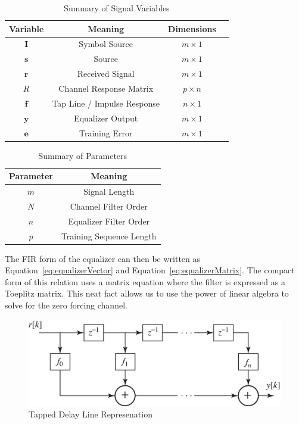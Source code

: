 \documentclass[]{article}
\begin{document}
\begin{table}[H]
\begin{center}
\begin{tabular}{|c|c|c|c|}
\hline Variable & Meaning & Dimensions \\
\hline \hline
$\mathbf{I}$ & Symbol Source & $ m \times 1$ \\ \hline
$\mathbf{s}$ & Source & $m\times 1 $\\ \hline
$\mathbf{r}$ & Received Signal & $m\times 1$ \\ \hline
$R$ & Channel Response Matrix & $p\times n$ \\ \hline
$\mathbf{f}$ & Tap Line / Impulse Response & $n\times 1 $ \\ \hline
$\mathbf{y}$ & Equalizer Output & $ m\times 1 $ \\ \hline
 $\mathbf{e}$ & Training Error & $ m\times 1 $ \\ \hline
\end{tabular}
\caption{Summary of Signal Variables} \label{tab:filtersummary}
\end{center}
\end{table}

\begin{table}[b]
\begin{center}
\begin{tabular}{|c|c|}
\hline Parameter & Meaning \\
\hline \hline
$m$ & Signal Length \\ \hline
$N$ & Channel Filter Order \\ \hline
$n$ & Equalizer Filter Order \\ \hline
$p$ & Training Sequence Length \\ \hline
\end{tabular}
\caption{Summary of Parameters} \label{tab:Paramsummary}
\end{center}
\end{table}

The FIR form of the equalizer can then be written as Equation~\ref{eq:equalizerVector} and Equation~\ref{eq:equalizerMatrix}.  The compact form of this relation uses a matrix equation where the filter is expressed as a Toeplitz matrix.  This neat fact allows us to use the power of linear algebra to solve for the zero forcing channel.  
  
 
\begin{figure}[H]
\centering
\includegraphics[width=.6\textwidth]{tapEqualizer.png}
\caption{Tapped Delay Line Represenation\label{fig:tap}}
\end{figure}
\end{document}
